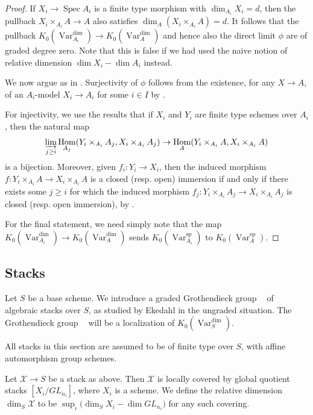 \documentclass{amsart}
\theoremstyle{definition}
\DeclareMathOperator{\Hom}{Hom}
\DeclareMathOperator{\Var}{Var}
\DeclareMathOperator{\spr}{sp}
\DeclareMathOperator{\Stk}{Stk}
\newcommand{\KdimS}{K_0(\Var_S^{\dim})}
\DeclareMathOperator{\KstkS}{K_0(\Stk_S^{\dim})}
\numberwithin{equation}{section}
\begin{document}
\begin{proof}
If $X_i \rightarrow \mathop{\mathrm{Spec}}A_i$ is a finite type morphism with $\dim_{A_i} X_i = d$, then the pullback $X_i \times_{A_i} A \rightarrow A$ also satisfies $\dim_A (X_i \times_{A_i} A) = d$. It follows that the pullback $K_0(\Var_{A_i}^{\dim}) \rightarrow K_0(\Var_A^{\dim})$ and hence also the direct limit $\phi$ are of graded degree zero. Note that this is false if we had used the naive notion of relative dimension $\dim X_i - \dim A_i$ instead.

We now argue as in \cite{spreadingout}. Surjectivity of $\phi$ follows from the existence, for any $X \rightarrow A$, of an $A_i$-model $X_i \rightarrow A_i$ for some $i \in I$ by \cite[IV$.8.8.2$]{ega}.

For injectivity, we use the results that if $X_i$ and $Y_i$ are finite type schemes over $A_i$, then the natural map
\begin{align*}
    \varinjlim_{j \geq i} \Hom_{A_j}(Y_i \times_{A_i} A_j, X_i \times_{A_i} A_j) \rightarrow \Hom_A(Y_i \times_{A_i} A, X_i \times_{A_i} A)
\end{align*}
is a bijection. Moreover, given $f_i: Y_i \rightarrow X_i$, then the induced morphism $f:Y_i \times_{A_i} A \rightarrow X_i \times_{A_i} A$ is a closed (resp. open) immersion if and only if there exists some $j \geq i$ for which the induced morphism $f_j:Y_i \times_{A_i} A_j \rightarrow X_i \times_{A_i} A_j$ is  closed (resp. open immersion), by \cite[IV$.8.8.2$ and IV$.8.10.5$]{ega}.

For the final statement, we need simply note that the map $K_0(\Var_{A_i}^{\dim}) \rightarrow K_0(\Var_A^{\dim})$ sends $K_0(\Var_{A_i}^{\spr})$ to $K_0(\Var_{A}^{\spr})$.
\end{proof}




\subsection{Stacks}

Let $S$ be a base scheme. We introduce a graded Grothendieck group $\KstkS$ of algebraic stacks over $S$, as studied by Ekedahl \cite{ekedahlstacks} in the ungraded situation. The Grothendieck group $\KstkS$ will be a localization of $\KdimS$. 

All stacks in this section are assumed to be of finite type over $S$, with affine automorphism group schemes.

Let $\mathscr{X} \rightarrow S$ be a stack as above. Then $\mathscr{X}$ is locally covered by global quotient stacks $[X_i / GL_{n_i}]$, where $X_i$ is a scheme. We define the relative dimension $\dim_S \mathscr{X}$ to be $\sup_i \big( \dim_S X_i - \dim GL_{n_i})$ for any such covering.
\end{document}
